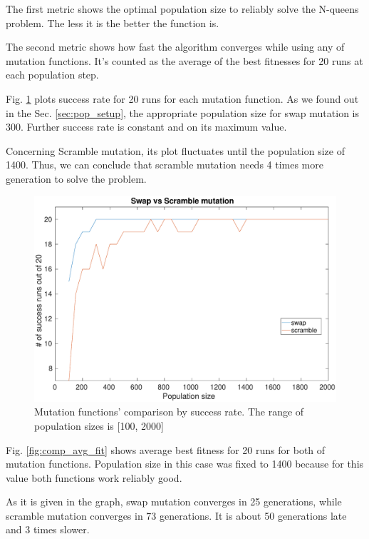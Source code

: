 \documentclass[12pt, a4paper]{article}
\begin{document}
        The first metric shows the optimal population size to reliably solve the
        N-queens problem. The less it is the better the function is.

        The second metric shows how fast the algorithm converges while using
        any of mutation functions. It's counted as the average of the best fitnesses
        for 20 runs at each population step.

        Fig. \ref{fig:comp_succ_rate} plots success rate for 20 runs for each
        mutation function. As we found out in the Sec. \ref{sec:pop_setup},
        the appropriate population size for swap mutation is 300. Further success
        rate is constant and on its maximum value.

        Concerning Scramble mutation, its plot fluctuates until the population
        size of 1400. Thus, we can conclude that scramble mutation needs 4 times
        more generation to solve the problem.

        \begin{figure}[H]
            \centering
            \includegraphics[width=\linewidth]{comparison_success_rate}
            \caption{Mutation functions' comparison by success rate. The range
                of population sizes is [100, 2000]}
            \label{fig:comp_succ_rate}
        \end{figure}

        Fig. \ref{fig:comp_avg_fit} shows average best fitness for 20 runs for
        both of mutation functions. Population size in this case was fixed to
        1400 because for this value both functions work reliably good.

        As it is given in the graph, swap mutation converges in 25 generations,
        while scramble mutation converges in 73 generations. It is about 50
        generations late and 3 times slower.
\end{document}
